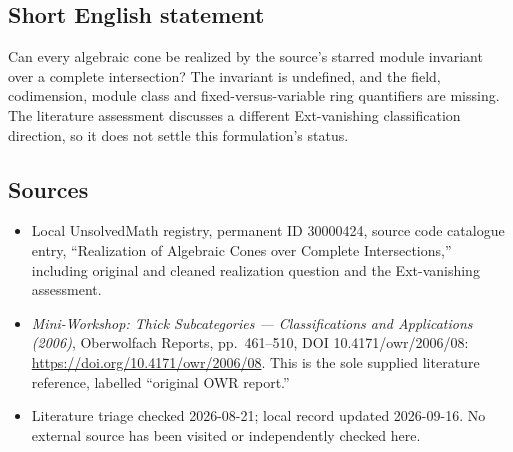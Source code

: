 \documentclass[11pt]{article}
\begin{document}
\subsection{Short English statement}
Can every algebraic cone be realized by the source's starred module invariant over a complete intersection? The invariant is undefined, and the field, codimension, module class and fixed-versus-variable ring quantifiers are missing. The literature assessment discusses a different Ext-vanishing classification direction, so it does not settle this formulation's status.
\subsection{Sources}
\begin{itemize}
\item Local UnsolvedMath registry, permanent ID 30000424, source code catalogue entry, ``Realization of Algebraic Cones over Complete Intersections,'' including original and cleaned realization question and the Ext-vanishing assessment.
\item \emph{Mini-Workshop: Thick Subcategories --- Classifications and Applications (2006)}, Oberwolfach Reports, pp.\ 461--510, DOI 10.4171/owr/2006/08: \url{https://doi.org/10.4171/owr/2006/08}. This is the sole supplied literature reference, labelled ``original OWR report.''
\item Literature triage checked 2026-08-21; local record updated 2026-09-16. No external source has been visited or independently checked here.
\end{itemize}
\end{document}
